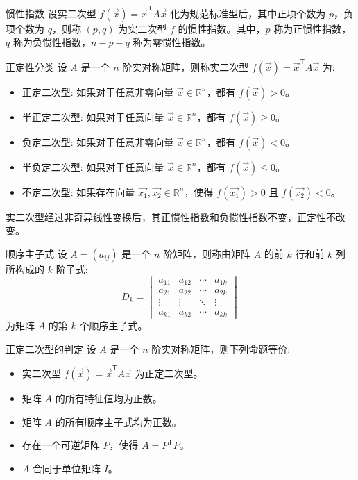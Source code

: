 \documentclass[a4paper,12pt]{ctexart}
\begin{document}
\begin{mydef}{惯性指数}{}
    设实二次型 $f(\vec{x}) = \vec{x}^{\mathsf{T}} A \vec{x}$ 化为规范标准型后，其中正项个数为 $p$，负项个数为 $q$，则称 $(p, q)$ 为实二次型 $f$ 的惯性指数。其中，$p$ 称为正惯性指数，$q$ 称为负惯性指数，$n - p - q$ 称为零惯性指数。
\end{mydef}

\begin{mydef}{正定性分类}{}
    设 $A$ 是一个 $n$ 阶实对称矩阵，则称实二次型 $f(\vec{x}) = \vec{x}^{\mathsf{T}} A \vec{x}$ 为:
    \begin{itemize}
        \item 正定二次型: 如果对于任意非零向量 $\vec{x} \in \mathbb{R}^n$，都有 $f(\vec{x}) > 0$。
        \item 半正定二次型: 如果对于任意向量 $\vec{x} \in \mathbb{R}^n$，都有 $f(\vec{x}) \geq 0$。
        \item 负定二次型: 如果对于任意非零向量 $\vec{x} \in \mathbb{R}^n$，都有 $f(\vec{x}) < 0$。
        \item 半负定二次型: 如果对于任意向量 $\vec{x} \in \mathbb{R}^n$，都有 $f(\vec{x}) \leq 0$。
        \item 不定二次型: 如果存在向量 $\vec{x_1}, \vec{x_2} \in \mathbb{R}^n$，使得 $f(\vec{x_1}) > 0$ 且 $f(\vec{x_2}) < 0$。
    \end{itemize}
\end{mydef}

\begin{mythm}{}{}
    实二次型经过非奇异线性变换后，其正惯性指数和负惯性指数不变，正定性不改变。
\end{mythm}

\begin{mydef}{顺序主子式}{}
    设 $A = (a_{ij})$ 是一个 $n$ 阶矩阵，则称由矩阵 $A$ 的前 $k$ 行和前 $k$ 列所构成的 $k$ 阶子式:
    \[
    D_k = \begin{vmatrix}
    a_{11} & a_{12} & \cdots & a_{1k} \\
    a_{21} & a_{22} & \cdots & a_{2k} \\
    \vdots & \vdots & \ddots & \vdots \\
    a_{k1} & a_{k2} & \cdots & a_{kk}
    \end{vmatrix}
    \]
    为矩阵 $A$ 的第 $k$ 个顺序主子式。
\end{mydef}

\begin{mythm}{正定二次型的判定}{}
    设 $A$ 是一个 $n$ 阶实对称矩阵，则下列命题等价:
    \begin{itemize}
        \item 实二次型 $f(\vec{x}) = \vec{x}^{\mathsf{T}} A \vec{x}$ 为正定二次型。
        \item 矩阵 $A$ 的所有特征值均为正数。
        \item 矩阵 $A$ 的所有顺序主子式均为正数。
        \item 存在一个可逆矩阵 $P$，使得 $A = P^{\mathsf{T}} P$。
        \item $A$ 合同于单位矩阵 $I$。
    \end{itemize}
\end{mythm}
\end{document}
